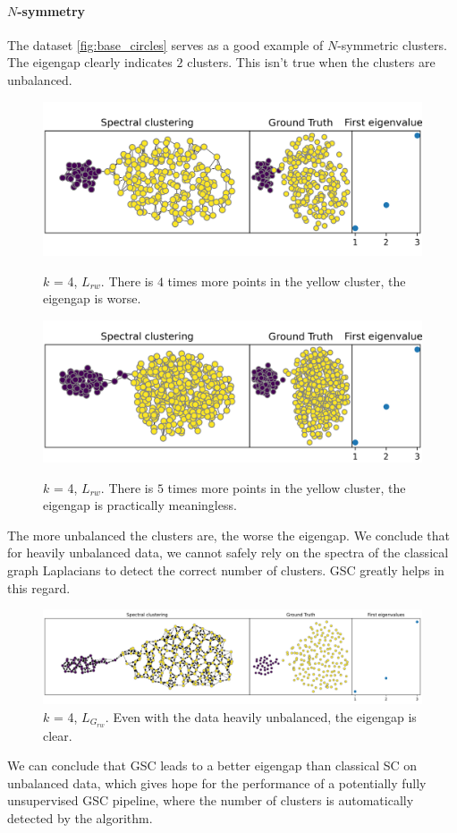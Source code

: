 \documentclass[a4paper,12pt]{article}
\theoremstyle{definition}
\theoremstyle{plain}
\begin{document}
\paragraph{$N$-symmetry}
The dataset \ref{fig:base_circles} serves as a good example of $N$-symmetric clusters. The eigengap clearly indicates $2$ clusters. This isn't true when the clusters are unbalanced.

\begin{figure}[H]
	\centering
	\includegraphics[width=0.6\linewidth]{figures/4x_asym_blobs_rw}
	\label{fig:mid_asym_blobs_rw}
	\caption{$k$ = 4, $L_{rw}$. There is $4$ times more points in the yellow cluster, the eigengap is worse.}
\end{figure}

\begin{figure}[H]
	\centering
	\includegraphics[width=0.6\linewidth]{figures/mid_asym_blobs_rw}
	\label{fig:4x_asym_blobs_rw}
	\caption{$k$ = 4, $L_{rw}$. There is $5$ times more points in the yellow cluster, the eigengap is practically meaningless.}
\end{figure}


The more unbalanced the clusters are, the worse the eigengap. We conclude that for heavily unbalanced data, we cannot safely rely on the spectra of the classical graph Laplacians to detect the correct number of clusters. GSC greatly helps in this regard.
\begin{figure}[H]
	\centering
	\includegraphics[width=0.7\linewidth]{figures/mid_asym_blobs_g_rw}
	\caption{$k$ = 4, $L_{G_{rw}}$. Even with the data heavily unbalanced, the eigengap is clear.}
	\label{fig:mid_asym_blobs_g_rw}
\end{figure}
We can conclude that GSC leads to a better eigengap than classical SC on unbalanced data, which gives hope for the performance of a potentially fully unsupervised GSC pipeline, where the number of clusters is automatically detected by the algorithm.
\end{document}
